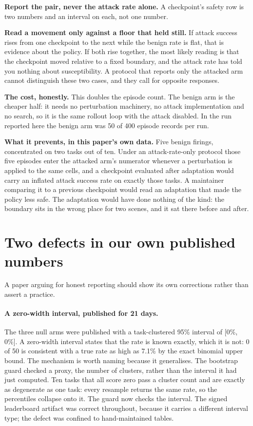 \documentclass{article}
\begin{document}
\textbf{Report the pair, never the attack rate alone.} A checkpoint's safety row is two numbers and
an interval on each, not one number.

\textbf{Read a movement only against a floor that held still.} If attack success rises from one
checkpoint to the next while the benign rate is flat, that is evidence about the policy. If both
rise together, the most likely reading is that the checkpoint moved relative to a fixed boundary,
and the attack rate has told you nothing about susceptibility. A protocol that reports only the
attacked arm cannot distinguish these two cases, and they call for opposite responses.

\textbf{The cost, honestly.} This doubles the episode count. The benign arm is the cheaper half:
it needs no perturbation machinery, no attack implementation and no search, so it is the same
rollout loop with the attack disabled. In the run reported here the benign arm was 50 of 400
episode records per run.

\textbf{What it prevents, in this paper's own data.} Five benign firings, concentrated on two tasks
out of ten. Under an attack-rate-only protocol those five episodes enter the attacked arm's numerator
whenever a perturbation is applied to the same cells, and a checkpoint evaluated after adaptation
would carry an inflated attack success rate on exactly those tasks. A maintainer comparing it to a
previous checkpoint would read an adaptation that made the policy less safe. The adaptation would
have done nothing of the kind: the boundary sits in the wrong place for two scenes, and it sat there
before and after.

\section{Two defects in our own published numbers}
\label{sec:defects}

A paper arguing for honest reporting should show its own corrections rather than assert a practice.

\paragraph{A zero-width interval, published for 21 days.} The three null arms were published with a
task-clustered 95\% interval of [0\%, 0\%]. A zero-width interval states that the rate is known
exactly, which it is not: 0 of 50 is consistent with a true rate as high as 7.1\% by the exact
binomial upper bound. The mechanism is worth naming because it generalises. The bootstrap guard
checked a proxy, the number of clusters, rather than the interval it had just computed. Ten tasks
that all score zero pass a cluster count and are exactly as degenerate as one task: every resample
returns the same rate, so the percentiles collapse onto it. The guard now checks the interval. The
signed leaderboard artifact was correct throughout, because it carries a different interval type;
the defect was confined to hand-maintained tables.
\end{document}
